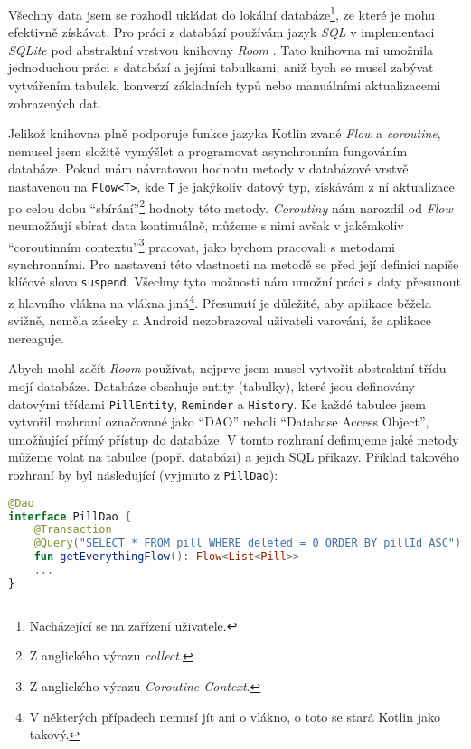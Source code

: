 \documentclass[../TakeYourPill.tex]{subfiles}
\begin{document}
Všechny data jsem se rozhodl ukládat do lokální databáze\footnote{Nacházející se na zařízení uživatele.}, ze které je mohu efektivně získávat. Pro práci z databází používám jazyk \textit{SQL} v implementaci \textit{SQLite} pod abstraktní vrstvou knihovny \textit{Room} \cite{room}. Tato knihovna mi umožnila jednoduchou práci s databází a jejími tabulkami, aniž bych se musel zabývat vytvářením tabulek, konverzí základních typů nebo manuálními aktualizacemi zobrazených dat. 

Jelikož knihovna plně podporuje funkce jazyka Kotlin zvané \textit{Flow} a \textit{coroutine}, nemusel jsem složitě vymýšlet a programovat asynchronním fungováním databáze. Pokud mám návratovou hodnotu metody v databázové vrstvě nastavenou na \texttt{Flow<T>}, kde \texttt{T} je jakýkoliv datový typ, získávám z ní aktualizace po celou dobu \enquote{sbírání}\footnote{Z anglického výrazu \textit{collect}.} hodnoty této metody. \textit{Coroutiny} nám narozdíl od \textit{Flow} neumožňují sbírat data kontinuálně, můžeme s nimi avšak v jakémkoliv \enquote{coroutinním contextu}\footnote{Z anglického výrazu \textit{Coroutine Context}.} pracovat, jako bychom pracovali s metodami synchronními. Pro nastavení této vlastnosti na metodě se před její definici napíše klíčové slovo \texttt{suspend}. Všechny tyto možnosti nám umožní práci s daty přesunout z hlavního vlákna na vlákna jiná\footnote{V některých případech nemusí jít ani o vlákno, o toto se stará Kotlin jako takový.}. Přesunutí je důležité, aby aplikace běžela svižně, neměla záseky a Android nezobrazoval uživateli varování, že aplikace nereaguje.

Abych mohl začít \textit{Room} používat, nejprve jsem musel vytvořit abstraktní třídu mojí databáze. Databáze obsahuje entity (tabulky), které jsou definovány datovými třídami \texttt{PillEntity}, \texttt{Reminder} a \texttt{History}. Ke každé tabulce jsem vytvořil rozhraní označované jako \enquote{DAO} neboli \enquote{Database Access Object}, umožňující přímý přístup do databáze. V tomto rozhraní definujeme jaké metody můžeme volat na tabulce (popř. databázi) a jejich SQL příkazy. Příklad takového rozhraní by byl následující (vyjmuto z \texttt{PillDao}):

\setmonofont{JetBrains Mono}
\begin{lstlisting}[language=Kotlin]
@Dao
interface PillDao {
    @Transaction
    @Query("SELECT * FROM pill WHERE deleted = 0 ORDER BY pillId ASC")
    fun getEverythingFlow(): Flow<List<Pill>>
    ...
}
\end{lstlisting}
\setmonofont{Latin Modern Mono}
\end{document}
